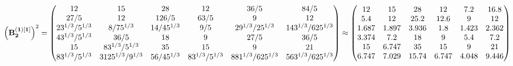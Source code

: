 \documentclass[10pt,a4paper]{article}
\begin{document}
	\[
		\left(\bold{B_2^{(1)[1]}}\right)^{2} = 
		\begin{pmatrix}
			{{12}}{} & {{15}}{} & {{28}}{} & {{12}}{} & {{36}} / {{5}} & {{84}} / {{5}} \\
			{{27}} / {{5}} & {{12}}{} & {{126}} / {{5}} & {{63}} / {{5}} & {{9}}{} & {{12}}{} \\
			{{2}{3^ {1 / 3}}} / {{5^ {1 / 3}}} & {{8}} / {{75^ {1 / 3}}} & {{14}} / {{45^ {1 / 3}}} & {{9}} / {{5}} & {{2}{9^ {1 / 3}}} / {{25^ {1 / 3}}} & {{14}{3^ {1 / 3}}} / {{625^ {1 / 3}}} \\
			{{4}{3^ {1 / 3}}} / {{5^ {1 / 3}}} & {{36}} / {{5}} & {{18}}{} & {{9}}{} & {{27}} / {{5}} & {{36}} / {{5}} \\
			{{15}}{} & {{8}{3^ {1 / 3}}} / {{5^ {1 / 3}}} & {{35}}{} & {{15}}{} & {{9}}{} & {{21}}{} \\
			{{8}{3^ {1 / 3}}} / {{5^ {1 / 3}}} & {{3125^ {1 / 3}}} / {{9^ {1 / 3}}} & {{56}} / {{45^ {1 / 3}}} & {{8}{3^ {1 / 3}}} / {{5^ {1 / 3}}} & {{8}{81^ {1 / 3}}} / {{625^ {1 / 3}}} & {{56}{3^ {1 / 3}}} / {{625^ {1 / 3}}} \\
		\end{pmatrix}
		\approx
		\begin{pmatrix}
			12       & 15       & 28       & 12       & 7.2      & 16.8     \\
			5.4      & 12       & 25.2     & 12.6     & 9        & 12       \\
			1.687    & 1.897    & 3.936    & 1.8      & 1.423    & 2.362    \\
			3.374    & 7.2      & 18       & 9        & 5.4      & 7.2      \\
			15       & 6.747    & 35       & 15       & 9        & 21       \\
			6.747    & 7.029    & 15.74    & 6.747    & 4.048    & 9.446    \\
		\end{pmatrix}
	\]
\end{document}
